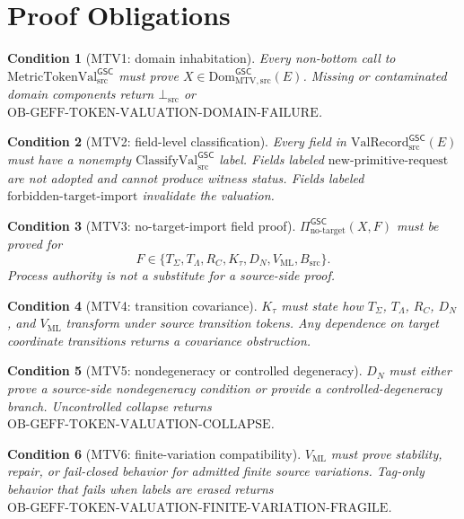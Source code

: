 \documentclass[11pt]{article}
\newcommand{\MetricTokenVal}{\mathrm{MetricTokenVal}_{\mathrm{src}}^{\mathsf{GSC}}}
\newcommand{\DomMTV}{\mathrm{Dom}_{\mathrm{MTV,src}}^{\mathsf{GSC}}}
\newcommand{\ValRecord}{\mathrm{ValRecord}_{\mathrm{src}}^{\mathsf{GSC}}}
\newcommand{\BottomSrc}{\bot_{\mathrm{src}}}
\newcommand{\ClassVal}{\mathrm{ClassifyVal}_{\mathrm{src}}^{\mathsf{GSC}}}
\newcommand{\NoTarget}{\Pi_{\mathrm{no\mbox{-}target}}^{\mathsf{GSC}}}
\newtheorem{condition}{Condition}
\begin{document}
\section{Proof Obligations}

\begin{condition}[MTV1: domain inhabitation]
Every non-bottom call to \(\MetricTokenVal\) must prove
\(X\in\DomMTV(E)\). Missing or contaminated domain components return
\(\BottomSrc\) or
\(\mathrm{OB\mbox{-}GEFF\mbox{-}TOKEN\mbox{-}VALUATION\mbox{-}DOMAIN\mbox{-}FAILURE}\).
\end{condition}

\begin{condition}[MTV2: field-level classification]
Every field in \(\ValRecord(E)\) must have a nonempty \(\ClassVal\) label.
Fields labeled \(\mathrm{new\mbox{-}primitive\mbox{-}request}\) are not
adopted and cannot produce witness status. Fields labeled
\(\mathrm{forbidden\mbox{-}target\mbox{-}import}\) invalidate the valuation.
\end{condition}

\begin{condition}[MTV3: no-target-import field proof]
\(\NoTarget(X,F)\) must be proved for
\[
F\in \{T_{\Sigma},T_{\Lambda},R_C,K_{\tau},D_N,V_{\mathrm{ML}},B_{\mathrm{src}}\}.
\]
Process authority is not a substitute for a source-side proof.
\end{condition}

\begin{condition}[MTV4: transition covariance]
\(K_{\tau}\) must state how \(T_{\Sigma}\), \(T_{\Lambda}\), \(R_C\),
\(D_N\), and \(V_{\mathrm{ML}}\) transform under source transition tokens.
Any dependence on target coordinate transitions returns a covariance
obstruction.
\end{condition}

\begin{condition}[MTV5: nondegeneracy or controlled degeneracy]
\(D_N\) must either prove a source-side nondegeneracy condition or provide a
controlled-degeneracy branch. Uncontrolled collapse returns
\(\mathrm{OB\mbox{-}GEFF\mbox{-}TOKEN\mbox{-}VALUATION\mbox{-}COLLAPSE}\).
\end{condition}

\begin{condition}[MTV6: finite-variation compatibility]
\(V_{\mathrm{ML}}\) must prove stability, repair, or fail-closed behavior for
admitted finite source variations. Tag-only behavior that fails when labels
are erased returns
\(\mathrm{OB\mbox{-}GEFF\mbox{-}TOKEN\mbox{-}VALUATION\mbox{-}FINITE\mbox{-}VARIATION\mbox{-}FRAGILE}\).
\end{condition}
\end{document}
